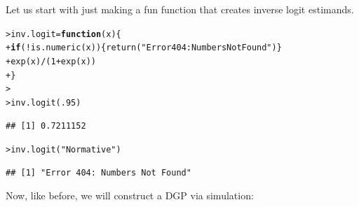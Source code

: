 \documentclass[12pt]{article}\usepackage[]{graphicx}\usepackage[]{color}
\makeatletter
\newcommand{\hlnum}[1]{\textcolor[rgb]{0.82,0.78,0.62}{#1}}%
\newcommand{\hlstr}[1]{\textcolor[rgb]{0.82,0.78,0.62}{#1}}%
\newcommand{\hlopt}[1]{\textcolor[rgb]{0.882,0.878,0.898}{#1}}%
\newcommand{\hlstd}[1]{\textcolor[rgb]{0.882,0.878,0.898}{#1}}%
\newcommand{\hlkwa}[1]{\textcolor[rgb]{0.384,0.675,0.808}{\textbf{#1}}}%
\newcommand{\hlkwb}[1]{\textcolor[rgb]{0.902,0.675,0.196}{#1}}%
\newcommand{\hlkwc}[1]{\textcolor[rgb]{0.812,0.522,0.388}{#1}}%
\newcommand{\hlkwd}[1]{\textcolor[rgb]{0.733,0.388,0.812}{#1}}%
\newenvironment{kframe}{%
 \def\at@end@of@kframe{}%
 \ifinner\ifhmode%
  \def\at@end@of@kframe{\end{minipage}}%
  \begin{minipage}{\columnwidth}%
 \fi\fi%
 \def\FrameCommand##1{\hskip\@totalleftmargin \hskip-\fboxsep
 \colorbox{shadecolor}{##1}\hskip-\fboxsep
     \hskip-\linewidth \hskip-\@totalleftmargin \hskip\columnwidth}%
 \MakeFramed {\advance\hsize-\width
   \@totalleftmargin\z@ \linewidth\hsize
   \@setminipage}}%
 {\par\unskip\endMakeFramed%
 \at@end@of@kframe}
\newenvironment{knitrout}{}{} %
\makeatother
\begin{document}
\begin{flushleft}
Let us start with just making a fun function that creates inverse logit estimands.

\begin{knitrout}
\color{fgcolor}\begin{kframe}
\begin{alltt}
\hlstd{> }\hlstd{inv.logit} \hlkwb{=} \hlkwa{function}\hlstd{(}\hlkwc{x}\hlstd{)\{}
\hlstd{+ }  \hlkwa{if}\hlstd{(}\hlopt{!}\hlkwd{is.numeric}\hlstd{(x))\{}\hlkwd{return}\hlstd{(}\hlstr{"Error 404: Numbers Not Found"}\hlstd{)\}}
\hlstd{+ }  \hlkwd{exp}\hlstd{(x)}\hlopt{/}\hlstd{(}\hlnum{1}\hlopt{+}\hlkwd{exp}\hlstd{(x))}
\hlstd{+ }\hlstd{\}}
\hlstd{> }
\hlstd{> }\hlkwd{inv.logit}\hlstd{(}\hlnum{.95}\hlstd{)}
\end{alltt}
\begin{verbatim}
## [1] 0.7211152
\end{verbatim}
\begin{alltt}
\hlstd{> }\hlkwd{inv.logit}\hlstd{(}\hlstr{"Normative"}\hlstd{)}
\end{alltt}
\begin{verbatim}
## [1] "Error 404: Numbers Not Found"
\end{verbatim}
\end{kframe}
\end{knitrout}

Now, like before, we will construct a DGP via simulation:


\end{flushleft}
\end{document}
